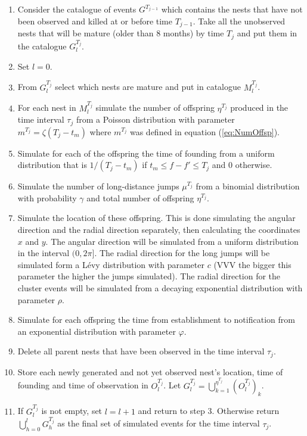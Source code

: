 \documentclass[11pt,a4paper]{article}
\begin{document}
\begin{enumerate}
    \item Consider the catalogue of events $G^{T_{j-1}}$ which contains the nests that have not been observed and killed at or before time $T_{j-1}$. Take all the unobserved nests that will be mature (older than 8 months) by time $T_j$ and put them in the catalogue $G_l^{T_j}$.
    \item Set $l = 0$.
    \item From $G_l^{T_j}$ select which nests are mature and put in catalogue $M_l^{T_j}$.
    \item For each nest in $M_l^{T_j}$ simulate the number of offspring $\eta^{T_j}$ produced in the time interval $\tau_j$ from a Poisson distribution with parameter $ m^{T_j} = \zeta (T_j-t_m)$ where $m^{T_j}$ was defined in equation (\ref{eq:NumOffsp}).
    \item Simulate for each of the offspring the time of founding from a uniform distribution that is $1/(T_j-t_m)$ if $t_m \leq f - f' \leq T_j$ and $0$ otherwise.
    \item Simulate the number of long-distance jumps $\mu^{T_j}$ from a binomial distribution with probability $\gamma$ and total number of offspring $\eta^{T_j}$.
    \item Simulate the location of these offspring. This is done simulating the angular direction and the radial direction separately, then calculating the coordinates $x$ and $y$. The angular direction will be simulated from a uniform distribution in the interval $(0, 2\pi]$. The radial direction for the long jumps will be simulated form a L\'evy distribution with parameter $c$ (VVV the bigger this parameter the higher the jumps simulated). The radial direction for the cluster events will be simulated from a decaying exponential distribution with parameter $\rho$.
    \item Simulate for each offspring the time from establishment to notification from an exponential distribution with parameter $\varphi$.
    \item Delete all parent nests that have been observed in the time interval $\tau_j$.
    \item Store each newly generated and not yet observed nest's location, time of founding and time of observation in $O_l^{T_j}$. Let $G_{l}^{T_j} = \bigcup_{k=1}^{\eta^{T_j}} (O_l^{T_j})_k$.
    \item If $G_l^{T_j}$ is not empty, set $l = l+1$ and return to step 3. Otherwise return $\bigcup_{h=0}^l G^{T_j}_h$ as the final set of simulated events for the time interval $\tau_j$.

\end{enumerate}
\end{document}
